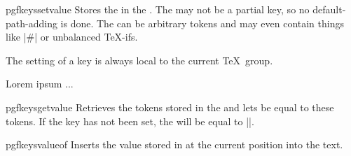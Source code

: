 \begin{docCommand}{pgfkeyssetvalue}{}{}
  Stores the  in the . The 
  may not be a partial key, so no default-path-adding is done. The
   can be arbitrary tokens and may even contain things
  like |#| or unbalanced \TeX-ifs.
\begin{codeexample}[]
\end{codeexample}

  The setting of a key is always local to the current \TeX\ group.
  
\begin{codeexample}[]
{  Lorem ipsum ...}
\end{codeexample}  
\end{docCommand}





\begin{docCommand}{pgfkeysgetvalue}{}{}
  Retrieves the tokens stored in the  and lets
   be equal to these tokens. If the key has
  not been set, the  will be equal to |\relax|. 
\begin{codeexample}[]
\helloworld
\end{codeexample}
\end{docCommand}



\begin{docCommand}{pgfkeysvalueof}{}
  Inserts the value stored in  at the current position
  into the text.

\begin{codeexample}[]
\end{codeexample}
\end{docCommand}

